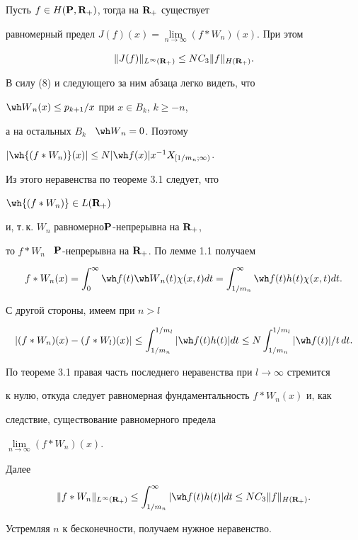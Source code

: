 \begin{thms}


Пусть $f\in H(\bold P,\bold R_+)$, тогда на $\bold R_+$ существует 


равномерный предел $J(f)(x)=\lim \limits_{n\to\infty}(f*W_n)(x)$. При этом 


$$


\|J(f)\|_{L^{\infty}({\bold R}_+)}\leq NC_3\|f\|_{H({\bold R}_+)}.


$$


\end{thms}








\begin{pf}


В силу (8) и следующего за ним абзаца легко видеть, что 


${\wh W}_n(x)\leq p_{k+1}/x$ при $x\in B_k$, $k\geq-n $,


а на остальных $B_k$ \ ${\wh W}_n=0$. Поэтому


$|\wh{(f*W_n)}(x)|\leq N|{\wh f}(x)|x^{-1}X_{[1/m_n;\infty)}$. 


Из этого неравенства по теореме 3.1 следует, что


$\wh{(f*W_n)}\in L({\bold R}_+)$


и, т.\,к. $W_n$ равномерно\linebreak $\bold P$-непрерывна на $\bold R_+$,


то $f*W_n$ \ $\bold P$-непрерывна на $\bold R_+$. По лемме 1.1 получаем


$$


f*W_n(x)=\int_0^{\infty}{\wh f}(t){\wh W}_n(t)\chi(x,t)dt=


\int^{\infty}_{1/m_n}{\wh f}(t)h(t)\chi(x,t)dt.


$$


С другой стороны, имеем при $n>l$


$$


|(f*W_n)(x)-(f*W_l)(x)|\leq \int^{1/m_l}_{1/m_n}|{\wh f}(t)h(t)|dt\leq


N\int^{1/m_l}_{1/m_n}|{\wh f}(t)|/t\,dt.


$$


По теореме 3.1 правая часть последнего неравенства при $l\to\infty$ стремится 


к нулю, откуда следует равномерная фундаментальность $f*W_n(x)$ и, как 


следствие, существование равномерного предела


$\lim \limits_{n\to\infty}(f*W_n)(x)$. 


Далее


$$


\|f*W_n\|_{L^{\infty}({\bold R}_+)}\leq\int^{\infty}_{1/m_n}|{\wh f}(t)h(t)|dt


\leq NC_3\|f\|_{H({\bold R}_+)}.


$$


Устремляя $n$ к бесконечности, получаем нужное неравенство.


\end{pf}








